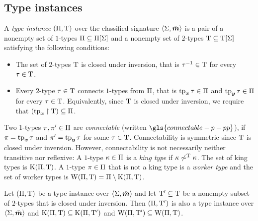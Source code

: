 \subsection{Type instances}
\begin{definition}\label{def:tpinst-twovar}
A \emph{type instance} $(\Pi,\mathrm{T})$ over the classified signature
$\left\langle \mathrm{\Sigma},\bar{\bm{m}} \right\rangle$ is a pair of a nonempty set of $1$-types
$\Pi\subseteq\Pi[\mathrm{\Sigma}]$ and a nonempty set of $2$-types $\mathrm{T}\subseteq\mathrm{T}[\mathrm{\Sigma}]$ satisfying the following conditions:
\begin{itemize}
  \item[\condtpii]
  The set of $2$-types $\mathrm{T}$ is closed under inversion, that is
  $\tau^{-1}\in\mathrm{T}$ for every $\tau\in\mathrm{T}$.
  \item[\condtpic]
  Every $2$-type $\tau\in\mathrm{T}$ connects $1$-types
  from $\Pi$, that is $\operatorname{tp}_{\bm{x}}\tau\in\Pi$ and $\operatorname{tp}_{\bm{y}}\tau\in\Pi$ for every
  $\tau\in\mathrm{T}$.
  Equivalently, since $\mathrm{T}$ is closed under inversion,
  we require that $(\operatorname{tp}_{\bm{x}}\restriction\mathrm{T})\subseteq\Pi$.
\end{itemize}
Two $1$-types $\pi, {\pi'} \in \Pi$ are \emph{connectable} 
(written $\gls{connectable-p-pp}$),
if $\pi = \operatorname{tp}_{\bm{x}}\tau$ and ${\pi'} = \operatorname{tp}_{\bm{y}}\tau$ for some $\tau \in \mathrm{T}$.
Connectability is symmetric since $\mathrm{T}$ is closed under inversion.
However, connectability is not necessarily neither transitive nor reflexive:
A $1$-type $\kappa \in \Pi$ is a \emph{king type} if 
$\kappa \not\sim^{\mathrm{T}}\kappa$. 
The set of king types is $\mathrm{K}(\Pi,\mathrm{T})$.
A $1$-type $\pi \in \Pi$ that is not a king type is a \emph{worker type}
and the set of worker types is $\mathrm{W}(\Pi,\mathrm{T}) = \Pi \setminus
\mathrm{K}(\Pi,\mathrm{T})$.
\end{definition}
\begin{remark}\label{rem:tpi-sub}
Let $(\Pi,\mathrm{T})$ be a type instance over $\left\langle \mathrm{\Sigma},\bar{\bm{m}} \right\rangle$ and let
${\mathrm{T}'} \subseteq \mathrm{T}$ be a nonempty subset of $2$-types that is closed 
under inversion. Then $(\Pi,{\mathrm{T}'})$ is also a type instance over
$\left\langle \mathrm{\Sigma},\bar{\bm{m}} \right\rangle$ and $\mathrm{K}(\Pi,\mathrm{T}) \subseteq \mathrm{K}(\Pi,{\mathrm{T}'})$ and
$\mathrm{W}(\Pi,{\mathrm{T}'}) \subseteq \mathrm{W}(\Pi,\mathrm{T})$.
\end{remark}

